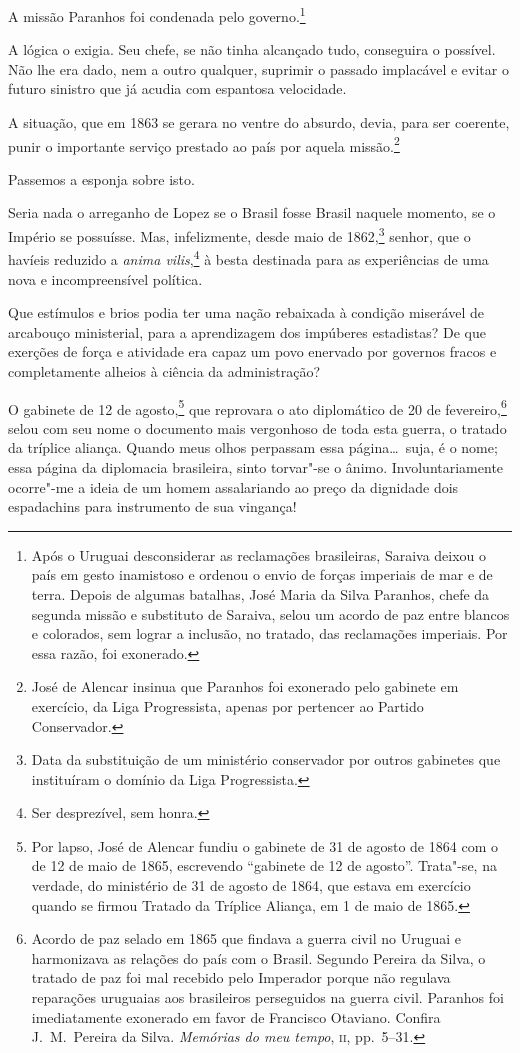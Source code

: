  A missão Paranhos foi condenada pelo
governo.\footnote{ Após o Uruguai desconsiderar as reclamações brasileiras, Saraiva 
deixou o país em gesto inamistoso e ordenou o envio de forças imperiais de mar e de terra. 
Depois de algumas batalhas, José Maria da Silva Paranhos, chefe da segunda missão e substituto 
de Saraiva, selou um acordo de paz entre blancos e colorados, sem lograr a inclusão, no tratado, 
das reclamações imperiais. Por essa razão, foi exonerado.}

 A lógica o exigia. Seu chefe, se não tinha alcançado tudo, conseguira o
possível. Não lhe era dado, nem a outro qualquer, suprimir o passado
implacável e evitar o futuro sinistro que já acudia com espantosa velocidade.

 A situação, que em 1863 se gerara no ventre do absurdo, devia, para ser
coerente, punir o importante serviço prestado ao país por aquela
missão.\footnote{ José de Alencar insinua que Paranhos foi exonerado pelo \mbox{gabinete} em exercício,
da Liga Progressista, apenas por pertencer ao Partido Conservador.}
 
 Passemos a esponja sobre isto.

 Seria nada o arreganho de Lopez se o Brasil fosse Brasil naquele
momento, se o Império se possuísse. Mas, infelizmente, desde maio de
1862,\footnote{ Data da substituição de um ministério conservador por outros gabinetes que
instituíram o domínio da Liga Progressista.}
 senhor, que o havíeis reduzido a \textit{anima vilis},\footnote{ Ser
desprezível, sem honra.}  à besta destinada para as experiências 
de uma nova e incompreensível política.

 Que estímulos e brios podia ter uma nação rebaixada à condição
miserável de arcabouço ministerial, para a aprendizagem dos impúberes
estadistas? De que exerções de força e atividade era capaz um povo
enervado por governos fracos e completamente alheios à ciência da administração?

 O gabinete de 12 de agosto,\footnote{ \label{gale}Por lapso, José de Alencar fundiu o gabinete 
de 31 de agosto de 1864 com o
de 12 de maio de 1865, escrevendo ``gabinete de 12 de agosto''.
Trata"-se, na verdade, do ministério de 31 de agosto de 1864, que
estava em exercício quando se firmou Tratado da Tríplice Aliança, em 1
de maio de 1865.}  que reprovara o ato diplomático de 20 de
fevereiro,\footnote{ Acordo de paz selado em 1865 que findava a guerra civil no Uruguai e
harmonizava as relações do país com o Brasil. Segundo Pereira da Silva,
o tratado de paz foi mal recebido pelo Imperador porque não regulava
reparações uruguaias aos brasileiros perseguidos na guerra civil.
Paranhos foi imediatamente exonerado em favor de Francisco Otaviano.
Confira J.~M.~Pereira da Silva. \textit{Memórias do meu tempo}, \textsc{ii}, pp.~5--31.}
 selou com seu nome o documento mais vergonhoso de toda esta guerra, o
tratado da tríplice aliança. Quando meus olhos perpassam essa página\ldots\
suja, é o nome; essa página da diplomacia brasileira, sinto torvar"-se
o ânimo. Involuntariamente ocorre"-me a ideia de um homem assalariando
ao preço da dignidade dois espadachins para instrumento de sua vingança!


